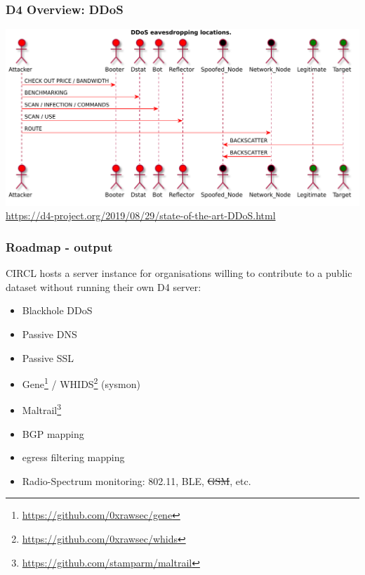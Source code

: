 \documentclass{beamer}
\begin{document}
\begin{frame}
\frametitle{D4 Overview: DDoS}
        \includegraphics[width=\textwidth]{../../diagram/theconversation.pdf}
        {\tiny \url{https://d4-project.org/2019/08/29/state-of-the-art-DDoS.html}}
\end{frame}

\begin{frame}
        \frametitle{Roadmap - output}

                  CIRCL hosts a server instance for organisations willing to
                  contribute to a public dataset without running their own D4 server:
                  \begin{itemize}
                  \item [\checkmark] Blackhole DDoS
                  \item [\checkmark] Passive DNS 
                  \item [\checkmark] Passive SSL 
                  \item Gene\footnote{\url{https://github.com/0xrawsec/gene}} / WHIDS\footnote{\url{https://github.com/0xrawsec/whids}} (sysmon)
                  \item Maltrail\footnote{\url{https://github.com/stamparm/maltrail}} 
                  \item BGP mapping 
                  \item egress filtering mapping
                  \item Radio-Spectrum monitoring: 802.11, BLE, \sout{GSM}, etc. 
                  \end{itemize}
\end{frame}
\end{document}
